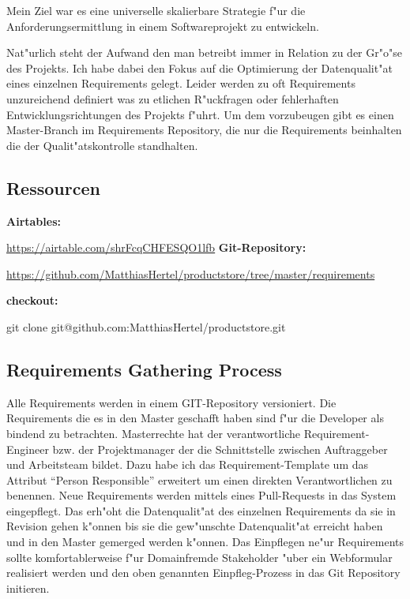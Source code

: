 \documentclass[12pt]{article}
\begin{document}
Mein Ziel war es eine universelle skalierbare Strategie f"ur die Anforderungsermittlung in einem Softwareprojekt zu entwickeln.

Nat"urlich steht der Aufwand den man betreibt immer in Relation zu der Gr"o"se des Projekts. Ich habe dabei den Fokus auf die Optimierung der Datenqualit"at eines einzelnen Requirements gelegt.
Leider werden zu oft Requirements unzureichend definiert was zu etlichen R"uckfragen oder fehlerhaften Entwicklungsrichtungen des Projekts f"uhrt.
Um dem vorzubeugen gibt es einen Master-Branch im Requirements Repository, die nur die Requirements beinhalten die der Qualit"atskontrolle standhalten.





\subsection{Ressourcen}
\textbf{Airtables:}

\url{https://airtable.com/shrFcqCHFESQO1lfb}
\bigbreak
\textbf{Git-Repository:}

\url{https://github.com/MatthiasHertel/productstore/tree/master/requirements}
\smallbreak

\textbf{checkout:}

git clone git@github.com:MatthiasHertel/productstore.git

\newpage
\subsection{Requirements Gathering Process}

Alle Requirements werden in einem GIT-Repository versioniert.
Die Requirements die es in den Master geschafft haben sind f"ur die Developer als bindend zu betrachten.
Masterrechte hat der verantwortliche Requirement-Engineer bzw. der Projektmanager der die Schnittstelle zwischen Auftraggeber und Arbeitsteam bildet.
Dazu habe ich das Requirement-Template um das Attribut ``Person Responsible'' erweitert um einen direkten Verantwortlichen zu benennen.
\smallbreak
Neue Requirements werden mittels eines Pull-Requests in das System eingepflegt. Das erh"oht die Datenqualit"at des einzelnen Requirements da sie in Revision gehen k"onnen bis sie die gew"unschte Datenqualit"at erreicht haben und in den Master gemerged werden k"onnen.
\smallbreak
Das Einpflegen ne"ur Requirements sollte komfortablerweise f"ur Domainfremde Stakeholder "uber ein Webformular realisiert werden und den oben genannten Einpfleg-Prozess in das Git Repository initieren.
\smallbreak
\end{document}
